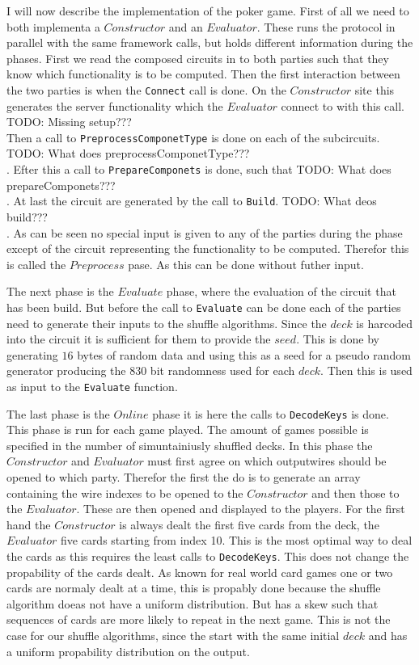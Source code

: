 \documentclass[twoside,11pt,openright]{report}
\newcommand{\todo}[1]{}
\renewcommand{\todo}[1]{{\color{red} TODO: {#1}} \\}
\begin{document}
\bigskip

I will now describe the implementation of the poker game. First of all we need to both implementa a $Constructor$ and an $Evaluator$. These runs the protocol in parallel with the same framework calls, but holds different information during the phases. First we read the composed circuits in to both parties such that they know which functionality is to be computed. 
Then the first interaction between the two parties is when the \verb|Connect| call is done. On the $Constructor$ site this generates the server functionality which the $Evaluator$ connect to with this call. 
\todo{Missing setup???}
Then a call to \verb|PreprocessComponetType| is done on each of the subcircuits. \todo{What does preprocessComponetType???}.  
Efter this a call to \verb|PrepareComponets| is done, such that \todo{What does prepareComponets???}.
At last the circuit are generated by the call to \verb|Build|. \todo{What deos build???}.
As can be seen no special input is given to any of the parties during the phase except of the circuit representing the functionality to be computed. Therefor this is called the $Preprocess$ pase. As this can be done without futher input.

The next phase is the $Evaluate$ phase, where the evaluation of the circuit that has been build. But before the call to \verb|Evaluate| can be done each of the parties need to generate their inputs to the shuffle algorithms. Since the $deck$ is harcoded into the circuit it is sufficient for them to provide the $seed$. This is done by generating $16$ bytes of random data and using this as a seed for a pseudo random generator producing the 830 bit randomness used for each $deck$. Then this is used as input to the \verb|Evaluate| function. 

The last phase is the $Online$ phase it is here the calls to \verb|DecodeKeys| is done. This phase is run for each game played. The amount of games possible is specified in the number of simuntainiusly shuffled decks. In this phase the $Constructor$ and $Evaluator$ must first agree on which outputwires should be opened to which party. Therefor the first the do is to generate an array containing the wire indexes to be opened to the $Constructor$ and then those to the $Evaluator$. These are then opened and displayed to the players. For the first hand the $Constructor$ is always dealt the first five cards from the deck, the $Evaluator$ five cards starting from index 10. This is the most optimal way to deal the cards as this requires the least calls to \verb|DecodeKeys|. This does not change the propability of the cards dealt. As known for real world card games one or two cards are normaly dealt at a time, this is propably done because the shuffle algorithm doeas not have a uniform distribution. But has a skew such that sequences of cards are more likely to repeat in the next game. This is not the case for our shuffle algorithms, since the start with the same initial $deck$ and has a uniform propability distribution on the output. 
\end{document}
